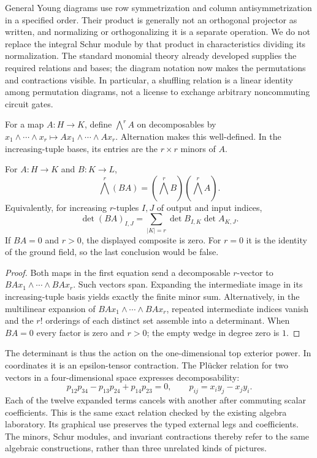 General Young diagrams use row symmetrization and column antisymmetrization in a specified order. Their product is generally not an orthogonal projector as written, and normalizing or orthogonalizing it is a separate operation. We do not replace the integral Schur module by that product in characteristics dividing its normalization. The standard monomial theory already developed supplies the required relations and bases; the diagram notation now makes the permutations and contractions visible. In particular, a shuffling relation is a linear identity among permutation diagrams, not a license to exchange arbitrary noncommuting circuit gates.

For a map $A:H\to K$, define $\bigwedge^r A$ on decomposables by
$x_1\wedge\cdots\wedge x_r\mapsto Ax_1\wedge\cdots\wedge Ax_r$.
Alternation makes this well-defined. In the increasing-tuple bases, its entries are the $r\times r$ minors of $A$.

\begin{proposition}
For $A:H\to K$ and $B:K\to L$,
\[
 \bigwedge^r(BA)=(\bigwedge^r B)(\bigwedge^r A).
\]
Equivalently, for increasing $r$-tuples $I,J$ of output and input indices,
\[
 \det(BA)_{I,J}=\sum_{|K|=r}\det B_{I,K}\det A_{K,J}.
\]
If $BA=0$ and $r>0$, the displayed composite is zero. For $r=0$ it is the identity of the ground field, so the last conclusion would be false.
\end{proposition}
\begin{proof}
Both maps in the first equation send a decomposable $r$-vector to
$BAx_1\wedge\cdots\wedge BAx_r$. Such vectors span. Expanding the intermediate image in its increasing-tuple basis yields exactly the finite minor sum. Alternatively, in the multilinear expansion of $BAx_1\wedge\cdots\wedge BAx_r$, repeated intermediate indices vanish and the $r!$ orderings of each distinct set assemble into a determinant. When $BA=0$ every factor is zero and $r>0$; the empty wedge in degree zero is $1$.
\end{proof}

The determinant is thus the action on the one-dimensional top exterior power. In coordinates it is an epsilon-tensor contraction. The Pl\"ucker relation for two vectors in a four-dimensional space expresses decomposability:
\[
 p_{12}p_{34}-p_{13}p_{24}+p_{14}p_{23}=0,
 \qquad p_{ij}=x_i y_j-x_j y_i.
\]
Each of the twelve expanded terms cancels with another after commuting scalar coefficients. This is the same exact relation checked by the existing algebra laboratory. Its graphical use preserves the typed external legs and coefficients. The minors, Schur modules, and invariant contractions thereby refer to the same algebraic constructions, rather than three unrelated kinds of pictures.

